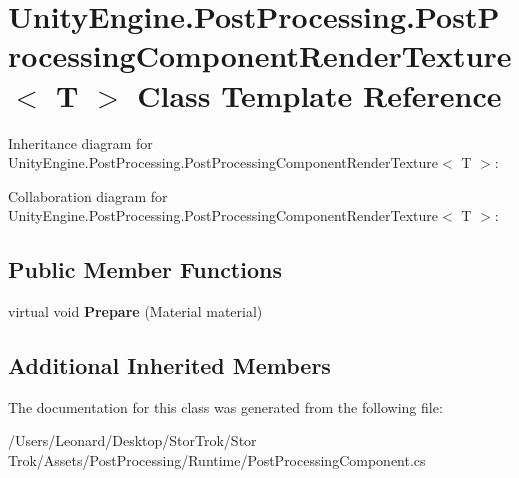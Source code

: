 \hypertarget{class_unity_engine_1_1_post_processing_1_1_post_processing_component_render_texture}{}\section{Unity\+Engine.\+Post\+Processing.\+Post\+Processing\+Component\+Render\+Texture$<$ T $>$ Class Template Reference}
\label{class_unity_engine_1_1_post_processing_1_1_post_processing_component_render_texture}


Inheritance diagram for Unity\+Engine.\+Post\+Processing.\+Post\+Processing\+Component\+Render\+Texture$<$ T $>$\+:


Collaboration diagram for Unity\+Engine.\+Post\+Processing.\+Post\+Processing\+Component\+Render\+Texture$<$ T $>$\+:
\subsection*{Public Member Functions}
\begin{DoxyCompactItemize}
\item 
\mbox{\label{class_unity_engine_1_1_post_processing_1_1_post_processing_component_render_texture_adcf0697959b318bf65a96ce47ee26732}} 
virtual void {\bfseries Prepare} (Material material)
\end{DoxyCompactItemize}
\subsection*{Additional Inherited Members}


The documentation for this class was generated from the following file\+:\begin{DoxyCompactItemize}
\item 
/\+Users/\+Leonard/\+Desktop/\+Stor\+Trok/\+Stor Trok/\+Assets/\+Post\+Processing/\+Runtime/Post\+Processing\+Component.\+cs\end{DoxyCompactItemize}
